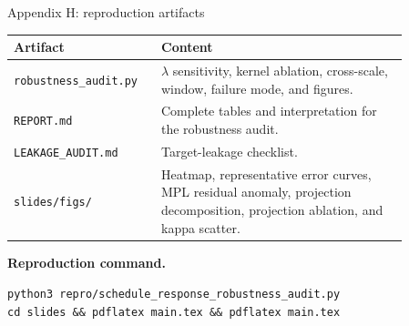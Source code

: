 \documentclass[9pt,aspectratio=169]{beamer}
\newcommand{\code}[1]{\texttt{\small #1}}
\begin{document}
\begin{frame}{Appendix H: reproduction artifacts}
\small
\begin{center}
\begin{tabular}{L{0.28\linewidth}L{0.58\linewidth}}
\toprule
Artifact & Content\\
\midrule
\code{robustness\_audit.py} &
\(\lambda\) sensitivity, kernel ablation, cross-scale, window, failure mode, and figures.\\
\addlinespace
\code{REPORT.md} &
Complete tables and interpretation for the robustness audit.\\
\addlinespace
\code{LEAKAGE\_AUDIT.md} &
Target-leakage checklist.\\
\addlinespace
\code{slides/figs/} &
Heatmap, representative error curves, MPL residual anomaly, projection decomposition,
projection ablation, and kappa scatter.\\
\bottomrule
\end{tabular}
\end{center}
\vfill
\textbf{Reproduction command.}
\begin{center}
\scriptsize
\code{python3 repro/schedule\_response\_robustness\_audit.py}\\[0.2em]
\code{cd slides \&\& pdflatex main.tex \&\& pdflatex main.tex}
\end{center}
\end{frame}
\end{document}
